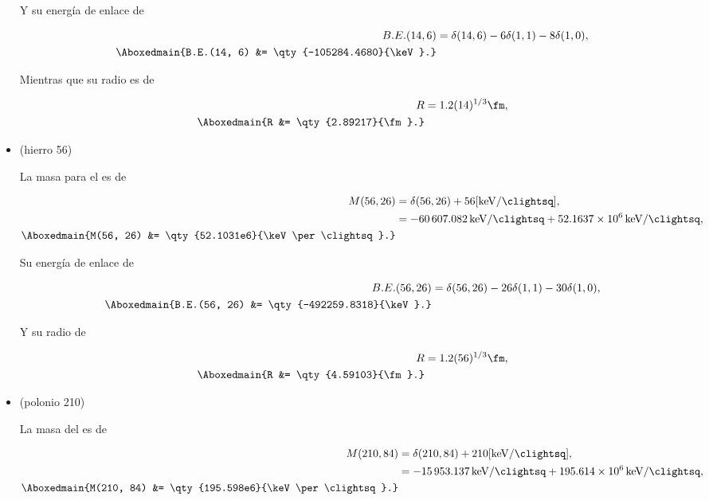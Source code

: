 \documentclass[./../main.tex]{subfiles}
\begin{document}
\begin{exercise}
\begin{solution}
\begin{itemize}
				Y su energía de enlace de

				\begin{align*}
					B.E.(14, 6) &= \delta(14, 6) - 6\delta(1, 1) - 8\delta(1, 0),\\
					\Aboxedmain{B.E.(14, 6) &= \qty{-105284.4680}{\keV}.}
				\end{align*}

				Mientras que su radio es de

				\begin{align*}
					R &= 1.2 (14)^{1/3}\unit{\fm},\\
					\Aboxedmain{R &= \qty{2.89217}{\fm}.}
				\end{align*}

			\pagebreak
                \item {} (hierro 56)
			
				La masa para el  es de

				\begin{align*}
					M(56, 26) &= \delta(56, 26) + 56 [\unit{\keV\per\clightsq}],\\
					&= \qty{-60607.082}{\keV\per\clightsq} + \qty{52.1637e6}{\keV\per\clightsq},\\
					\Aboxedmain{M(56, 26) &= \qty{52.1031e6}{\keV\per\clightsq}.}
				\end{align*}

				Su energía de enlace de

				\begin{align*}
					B.E.(56, 26) &= \delta(56, 26) - 26\delta(1, 1) - 30\delta(1, 0),\\
					\Aboxedmain{B.E.(56, 26) &= \qty{-492259.8318}{\keV}.}
				\end{align*}

				Y su radio de

				\begin{align*}
					R &= 1.2 (56)^{1/3}\unit{\fm},\\
					\Aboxedmain{R &= \qty{4.59103}{\fm}.}
				\end{align*}
			
			\item {} (polonio 210)
			
			La masa del  es de

			\begin{align*}
				M(210, 84) &= \delta(210, 84) + 210 [\unit{\keV\per\clightsq}],\\
				&= \qty{-15953.137}{\keV\per\clightsq} + \qty{195.614e6}{\keV\per\clightsq},\\
				\Aboxedmain{M(210, 84) &= \qty{195.598e6}{\keV\per\clightsq}.}
			\end{align*}


\end{itemize}
\end{solution}
\end{exercise}
\end{document}
